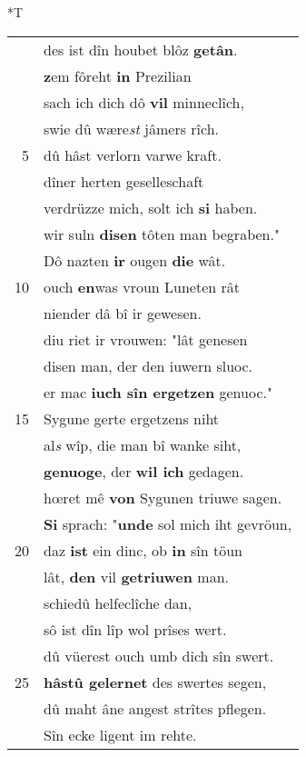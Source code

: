 \documentclass[8pt,a4paper,notitlepage]{article}
\begin{document}
\begin{table}[ht]
\begin{minipage}[t]{0.5\linewidth}
\end{minipage}
\hspace{0.5cm}
\begin{minipage}[t]{0.5\linewidth}
\small
\begin{center}*T
\end{center}
\begin{tabular}{rl}
 & des ist dîn houbet blôz \textbf{getân}.\\ 
 & \textbf{z}em fôreht \textbf{in} Prezilian\\ 
 & sach ich dich dô \textbf{vil} minneclîch,\\ 
 & swie dû wære\textit{st} jâmers rîch.\\ 
5 & dû hâst verlorn varwe kraft.\\ 
 & dîner herten geselleschaft\\ 
 & verdrüzze mich, solt ich \textbf{si} haben.\\ 
 & wir suln \textbf{disen} tôten man begraben."\\ 
 & Dô nazten \textbf{ir} ougen \textbf{die} wât.\\ 
10 & ouch \textbf{en}was vroun Luneten rât\\ 
 & niender dâ bî ir gewesen.\\ 
 & diu riet ir vrouwen: "lât genesen\\ 
 & disen man, der den iuwern sluoc.\\ 
 & er mac \textbf{iuch sîn ergetzen} genuoc."\\ 
15 & Sygune gerte ergetzens niht\\ 
 & al\textit{s} wîp, die man bî wanke siht,\\ 
 & \textbf{genuoge}, der \textbf{wil ich} gedagen.\\ 
 & hœret mê \textbf{von} Sygunen triuwe sagen.\\ 
 & \textbf{Si} sprach: "\textbf{unde} sol mich iht gevröun,\\ 
20 & daz \textbf{ist} ein dinc, ob \textbf{in} sîn töun\\ 
 & lât, \textbf{den} vil \textbf{getriuwen} man.\\ 
 & schiedû helfeclîche dan,\\ 
 & sô ist dîn lîp wol prîses wert.\\ 
 & dû vüerest ouch umb dich sîn swert.\\ 
25 & \textbf{hâstû gelernet} des swertes segen,\\ 
 & dû maht âne angest strîtes pflegen.\\ 
 & Sîn ecke ligent im rehte.\\ 

\end{tabular}
\end{minipage}
\end{table}
\end{document}
